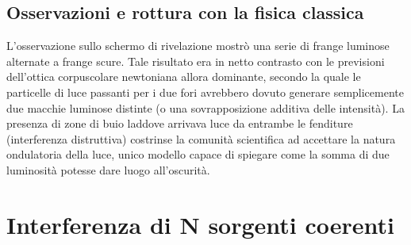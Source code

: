 \documentclass[a4paper,11pt]{report}
\begin{document}
\subsection{Osservazioni e rottura con la fisica classica}
L'osservazione sullo schermo di rivelazione mostrò una serie di frange luminose alternate a frange scure. Tale risultato era in netto contrasto con le previsioni dell'ottica corpuscolare newtoniana allora dominante, secondo la quale le particelle di luce passanti per i due fori avrebbero dovuto generare semplicemente due macchie luminose distinte (o una sovrapposizione additiva delle intensità).
La presenza di zone di buio laddove arrivava luce da entrambe le fenditure (interferenza distruttiva) costrinse la comunità scientifica ad accettare la natura ondulatoria della luce, unico modello capace di spiegare come la somma di due luminosità potesse dare luogo all'oscurità.


\section{Interferenza di N sorgenti coerenti}
\end{document}
